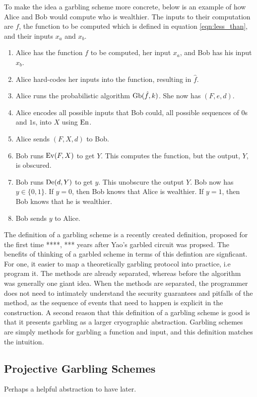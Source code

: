 \documentclass[12pt,twoside]{reedthesis}
\begin{document}
To make the idea a garbling scheme more concrete, below is an example of how Alice and Bob would compute who is wealthier. 
The inputs to their computation are $f$, the function to be computed which is defined in equation \ref{eqn:less_than}, and their inputs $x_a$ and $x_b$.
\begin{enumerate}
    \item Alice has the function $f$ to be computed, her input $x_a$, and Bob has his input $x_b$.
    \item Alice hard-codes her inputs into the function, resulting in $\hat{f}$.
    \item Alice runs the probabilistic algorithm $\operatorname{Gb}(\hat{f}, k)$. She now has $(F,e,d)$.
    \item Alice encodes all possible inputs that Bob could, all possible sequences of $0$s and $1$s, into $X$ using $\operatorname{En}$.
    \item Alice sends $(F,X,d)$ to Bob.
    \item Bob runs $\operatorname{Ev}(F,X)$ to get $Y$. This computes the function, but the output, $Y$, is obscured.
    \item Bob runs $\operatorname{De}(d,Y)$ to get $y$. This unobscure the output $Y$. Bob now has $y \in \{0,1\}$.
        If $y = 0$, then Bob knows that Alice is wealthier. 
        If $y = 1$, then Bob knows that he is wealthier.
    \item Bob sends $y$ to Alice.
\end{enumerate}

The definition of a garbling scheme is a recently created definition, proposed for the first time ****, *** years after Yao's garbled circuit was propsed.
The benefits of thinking of a garbled scheme in terms of this defintion are signficant.
For one, it easier to map a theoretically garbling protocol into practice, i.e program it. 
The methods are already separated, whereas before the algorithm was generally one giant idea.
When the methods are separated, the programmer does not need to intimately understand the security guarantees and pitfalls of the method, as the sequence of events that need to happen is explicit in the construction.
A second reason that this definition of a garbling scheme is good is that it presents garbling as a larger cryographic abstraction. 
Garbling schemes are simply methods for garbling a function and input, and this definition matches the intuition. 

\subsection{Projective Garbling Schemes}
Perhaps a helpful abstraction to have later.
\end{document}
